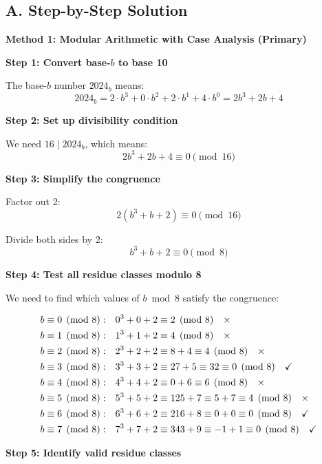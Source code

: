 \documentclass[11pt]{article}
\begin{document}
\begin{solutionbox}
\subsection*{A. Step-by-Step Solution}

\textbf{Method 1: Modular Arithmetic with Case Analysis (Primary)}

\textbf{Step 1: Convert base-$b$ to base 10}

The base-$b$ number $2024_b$ means:
\[
2024_b = 2 \cdot b^3 + 0 \cdot b^2 + 2 \cdot b^1 + 4 \cdot b^0 = 2b^3 + 2b + 4
\]

\textbf{Step 2: Set up divisibility condition}

We need $16 \mid 2024_b$, which means:
\[
2b^3 + 2b + 4 \equiv 0 \pmod{16}
\]

\textbf{Step 3: Simplify the congruence}

Factor out 2:
\[
2(b^3 + b + 2) \equiv 0 \pmod{16}
\]

Divide both sides by 2:
\[
b^3 + b + 2 \equiv 0 \pmod{8}
\]

\textbf{Step 4: Test all residue classes modulo 8}

We need to find which values of $b \bmod 8$ satisfy the congruence:

\begin{align*}
b \equiv 0 \pmod{8}: \quad & 0^3 + 0 + 2 \equiv 2 \pmod{8} \quad \text{\texttimes} \\
b \equiv 1 \pmod{8}: \quad & 1^3 + 1 + 2 \equiv 4 \pmod{8} \quad \text{\texttimes} \\
b \equiv 2 \pmod{8}: \quad & 2^3 + 2 + 2 \equiv 8 + 4 \equiv 4 \pmod{8} \quad \text{\texttimes} \\
b \equiv 3 \pmod{8}: \quad & 3^3 + 3 + 2 \equiv 27 + 5 \equiv 32 \equiv 0 \pmod{8} \quad \text{\checkmark} \\
b \equiv 4 \pmod{8}: \quad & 4^3 + 4 + 2 \equiv 0 + 6 \equiv 6 \pmod{8} \quad \text{\texttimes} \\
b \equiv 5 \pmod{8}: \quad & 5^3 + 5 + 2 \equiv 125 + 7 \equiv 5 + 7 \equiv 4 \pmod{8} \quad \text{\texttimes} \\
b \equiv 6 \pmod{8}: \quad & 6^3 + 6 + 2 \equiv 216 + 8 \equiv 0 + 0 \equiv 0 \pmod{8} \quad \text{\checkmark} \\
b \equiv 7 \pmod{8}: \quad & 7^3 + 7 + 2 \equiv 343 + 9 \equiv -1 + 1 \equiv 0 \pmod{8} \quad \text{\checkmark}
\end{align*}

\textbf{Step 5: Identify valid residue classes}


\end{solutionbox}
\end{document}
